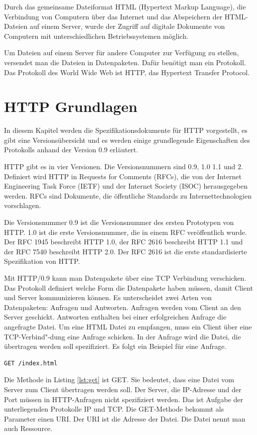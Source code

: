 \documentclass{llncs}
\begin{document}
Durch das gemeinsame Dateiformat HTML (Hypertext Markup Language), die Verbindung von Computern über das Internet und das Abspeichern der HTML-Dateien auf einem Server, wurde der Zugriff auf digitale Dokumente von Computern mit unterschiedlichen Betriebssystemen möglich.

Um Dateien auf einem Server für andere Computer zur Verfügung zu stellen, versendet man die Dateien in Datenpaketen. Dafür benötigt man ein Protokoll. Das Protokoll des World Wide Web ist HTTP, das Hypertext Transfer Protocol.
\section{HTTP Grundlagen}
In diesem Kapitel werden die Spezifikationsdokumente für HTTP vorgestellt, es gibt eine Versionsübersicht und es werden einige grundlegende Eigenschaften des Protokolls anhand der Version 0.9 erläutert. 

HTTP gibt es in vier Versionen. Die Versionsnummern sind 0.9, 1.0 1.1 und 2. Definiert wird HTTP in Requests for Comments (RFCs), die von der Internet Engineering Task Force (IETF) und der Internet Society (ISOC) herausgegeben werden. RFCs sind Dokumente, die öffentliche Standards zu Internettechnologien vorschlagen.

Die Versionsnummer 0.9 ist die Versionsnummer des ersten Prototypen von HTTP. 1.0 ist die erste Versionsnummer, die in einem RFC veröffentlich wurde. Der RFC 1945 beschreibt HTTP 1.0, der RFC 2616 beschreibt HTTP 1.1 und der RFC 7540 beschreibt HTTP 2.0.
Der RFC 2616 ist die erste standardisierte Spezifikation von HTTP.


Mit HTTP/0.9 kann man Datenpakete über eine TCP Verbindung verschicken. Das Protokoll definiert welche Form die Datenpakete haben müssen, damit Client und Server kommunizieren können. Es unterscheidet zwei Arten von Datenpaketen: Anfragen und Antworten. Anfragen werden vom Client an den Server geschickt. Antworten enthalten bei einer erfolgreichen Anfrage die angefragte Datei. Um eine HTML Datei zu empfangen, muss ein Client über eine TCP-Verbind"-dung eine Anfrage schicken. In der Anfrage wird die Datei, die übertragen werden soll spezifiziert. Es folgt ein Beispiel für eine Anfrage.

\lstset{ 
  basicstyle=\ttfamily, frame = single
}
\begin{lstlisting}[caption={HTTP GET-Anfrage},label={lst:get}]
GET /index.html
\end{lstlisting}

Die Methode in Listing \ref{lst:get} ist GET. Sie bedeutet, dass eine Datei vom Server zum Client übertragen werden soll. Der Server, die IP-Adresse und der Port müssen in HTTP-Anfragen nicht spezifiziert werden. Das ist Aufgabe der unterliegenden Protokolle IP und TCP. Die GET-Methode bekommt als Parameter einen URI. Der URI ist die Adresse der Datei. Die Datei nennt man auch Ressource.
\end{document}
